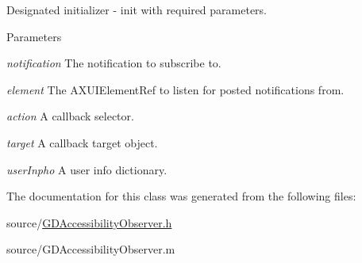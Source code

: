 Designated initializer -\/ init with required parameters. 
\begin{DoxyParams}{Parameters}
\item[{\em notification}]The notification to subscribe to. \item[{\em element}]The AXUIElementRef to listen for posted notifications from. \item[{\em action}]A callback selector. \item[{\em target}]A callback target object. \item[{\em userInpho}]A user info dictionary. \end{DoxyParams}


The documentation for this class was generated from the following files:\begin{DoxyCompactItemize}
\item 
source/\hyperlink{_g_d_accessibility_observer_8h}{GDAccessibilityObserver.h}\item 
source/GDAccessibilityObserver.m\end{DoxyCompactItemize}
